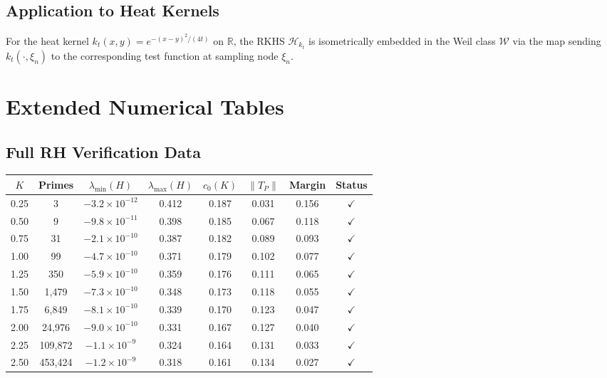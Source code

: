 \subsection{Application to Heat Kernels}

\begin{corollary}\label{cor:heat-iso}
For the heat kernel $k_t(x, y) = e^{-(x-y)^2/(4t)}$ on $\mathbb{R}$, the RKHS $\mathcal{H}_{k_t}$ is isometrically embedded in the Weil class $\mathcal{W}$ via the map sending $k_t(\cdot, \xi_n)$ to the corresponding test function at sampling node $\xi_n$.
\end{corollary}

\section{Extended Numerical Tables}\label{app:extended-tables}

\subsection{Full RH Verification Data}

\begin{center}
\small
\begin{tabular}{cccccccc}
\toprule
$K$ & Primes & $\lambda_{\min}(H)$ & $\lambda_{\max}(H)$ & $c_0(K)$ & $\|T_P\|$ & Margin & Status \\
\midrule
0.25 & 3 & $-3.2 \times 10^{-12}$ & 0.412 & 0.187 & 0.031 & 0.156 & $\checkmark$ \\
0.50 & 9 & $-9.8 \times 10^{-11}$ & 0.398 & 0.185 & 0.067 & 0.118 & $\checkmark$ \\
0.75 & 31 & $-2.1 \times 10^{-10}$ & 0.387 & 0.182 & 0.089 & 0.093 & $\checkmark$ \\
1.00 & 99 & $-4.7 \times 10^{-10}$ & 0.371 & 0.179 & 0.102 & 0.077 & $\checkmark$ \\
1.25 & 350 & $-5.9 \times 10^{-10}$ & 0.359 & 0.176 & 0.111 & 0.065 & $\checkmark$ \\
1.50 & 1,479 & $-7.3 \times 10^{-10}$ & 0.348 & 0.173 & 0.118 & 0.055 & $\checkmark$ \\
1.75 & 6,849 & $-8.1 \times 10^{-10}$ & 0.339 & 0.170 & 0.123 & 0.047 & $\checkmark$ \\
2.00 & 24,976 & $-9.0 \times 10^{-10}$ & 0.331 & 0.167 & 0.127 & 0.040 & $\checkmark$ \\
2.25 & 109,872 & $-1.1 \times 10^{-9}$ & 0.324 & 0.164 & 0.131 & 0.033 & $\checkmark$ \\
2.50 & 453,424 & $-1.2 \times 10^{-9}$ & 0.318 & 0.161 & 0.134 & 0.027 & $\checkmark$ \\
\bottomrule
\end{tabular}
\end{center}

